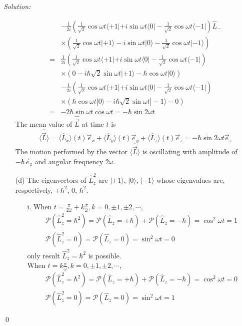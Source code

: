 \documentclass[12pt,a4paper]{article}
\newenvironment{sol}
    {\emph{Solution:}
    }
    {
    \qed
    }
\begin{document}
\begin{sol}
\begin{itemize}
\begin{align}
\nonumber&-\frac{1}{2i}(\frac{1}{\sqrt{2}}\cos\omega t\langle+1|+i\sin\omega t\langle0|-\frac{1}{\sqrt{2}}\cos\omega t\langle-1|)\hat{L}_-\\
\nonumber&\times(\frac{1}{\sqrt{2}}\cos\omega t|+1\rangle-i\sin\omega t|0\rangle-\frac{1}{\sqrt{2}}\cos\omega t|-1\rangle)\\
\nonumber=&\frac{1}{2i}(\frac{1}{\sqrt{2}}\cos\omega t\langle+1|+i\sin\omega t\langle0|-\frac{1}{\sqrt{2}}\cos\omega t\langle-1|)\\
\nonumber&\times(0-i\hbar\sqrt{2}\sin\omega t|+1\rangle-\hbar\cos\omega t|0\rangle)\\
\nonumber&-\frac{1}{2i}(\frac{1}{\sqrt{2}}\cos\omega t\langle+1|+i\sin\omega t\langle0|-\frac{1}{\sqrt{2}}\cos\omega t\langle-1|)\\
\nonumber&\times(\hbar\cos\omega t|0\rangle-i\hbar\sqrt{2}\sin\omega t|-1\rangle-0)\\
=&-2\hbar\sin\omega t\cos\omega t=-\hbar\sin2\omega t
\end{align}
The mean value of $\hat{\vec{L}}$ at time $t$ is
\begin{equation}
\langle\hat{\vec{L}}\rangle=\langle\hat{L}_x\rangle(t)\vec{e}_x+\langle\hat{L}_y\rangle(t)\vec{e}_y+\langle\hat{L}_z\rangle(t)\vec{e}_z=-\hbar\sin2\omega t\vec{e}_z
\end{equation}
The motion performed by the vector $\langle\hat{\vec{L}}\rangle$ is oscillating with amplitude of $-\hbar\vec{e}_z$ and angular frequency $2\omega$.
\item[(d)] The eigenvectors of $\hat{L}_z^2$ are $|+1\rangle$, $|0\rangle$, $|-1\rangle$ whose eigenvalues are, respectively, $+\hbar^2$, $0$, $\hbar^2$.
\begin{itemize}
\item[i.] When $t=\frac{\pi}{2\omega}+k\frac{\pi}{\omega},k=0,\pm1,\pm2,\cdots$,
\begin{gather}
\mathcal{P}(\hat{L}_z^2=\hbar^2)=\mathcal{P}(\hat{L}_z=+\hbar)+\mathcal{P}(\hat{L}_z=-\hbar)=\cos^2\omega t=1\\
\mathcal{P}(\hat{L}_z^2=0)=\mathcal{P}(\hat{L}_z=0)=\sin^2\omega t=0
\end{gather}
only result $\hat{L}_z^2=\hbar^2$ is possible.\\
When $t=k\frac{\pi}{\omega},k=0,\pm1,\pm2,\cdots$,
\begin{gather}
\mathcal{P}(\hat{L}_z^2=\hbar^2)=\mathcal{P}(\hat{L}_z=+\hbar)+\mathcal{P}(\hat{L}_z=-\hbar)=\cos^2\omega t=0\\
\mathcal{P}(\hat{L}_z^2=0)=\mathcal{P}(\hat{L}_z=0)=\sin^2\omega t=1

\end{gather}
\end{itemize}
\end{itemize}
\end{sol}
\end{document}
